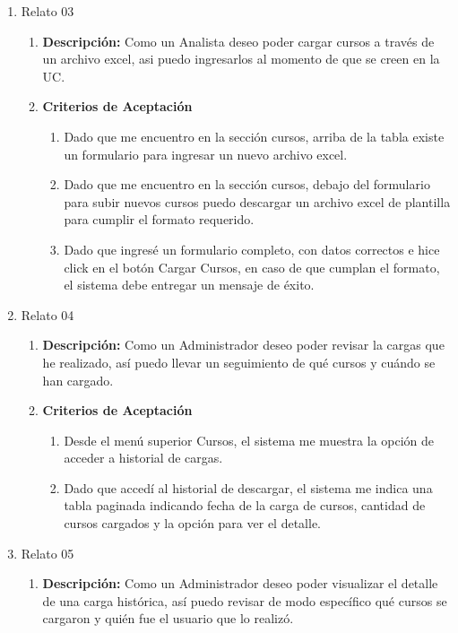 \begin{enumerate}
\begin{enumerate}
\begin{enumerate}
				\end{enumerate}
		\end{enumerate}
	\item Relato 03
		\begin{enumerate}
			\item \textbf{Descripción:} Como un Analista deseo poder cargar cursos a través de un archivo excel, asi puedo ingresarlos al momento de que se creen en la UC.
			\item \textbf{Criterios de Aceptación}
				\begin{enumerate}
					\item Dado que me encuentro en la sección cursos, arriba de la tabla existe un formulario para ingresar un nuevo archivo excel.
					\item Dado que me encuentro en la sección cursos, debajo del formulario para subir nuevos cursos puedo descargar un archivo excel de plantilla para cumplir el formato requerido.
					\item Dado que ingresé un formulario completo, con datos correctos e hice click en el botón Cargar Cursos, en caso de que cumplan el formato, el sistema debe entregar un mensaje de éxito.
				\end{enumerate}
		\end{enumerate}
	\item Relato 04
		\begin{enumerate}
			\item \textbf{Descripción:} Como un Administrador deseo poder revisar la cargas que he realizado, así puedo llevar un seguimiento de qué cursos y cuándo se han cargado.
			\item \textbf{Criterios de Aceptación}
				\begin{enumerate}
					\item Desde el menú superior Cursos, el sistema me muestra la opción de acceder a historial de cargas.
					\item Dado que accedí al historial de descargar, el sistema me indica una tabla paginada indicando fecha de la carga de cursos, cantidad de cursos cargados y la opción para ver el detalle.
				\end{enumerate}
		\end{enumerate}
	\item Relato 05
		\begin{enumerate}
			\item \textbf{Descripción:} Como un Administrador deseo poder visualizar el detalle de una carga histórica, así puedo revisar de modo específico qué cursos se cargaron y quién fue el usuario que lo realizó.

\end{enumerate}
\end{enumerate}
